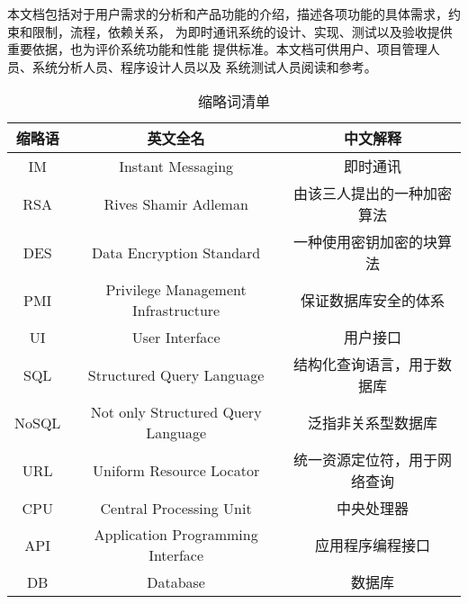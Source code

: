     本文档包括对于用户需求的分析和产品功能的介绍，描述各项功能的具体需求，约束和限制，流程，依赖关系，
    为即时通讯系统的设计、实现、测试以及验收提供重要依据，也为评价系统功能和性能
    提供标准。本文档可供用户、项目管理人员、系统分析人员、程序设计人员以及
    系统测试人员阅读和参考。
\begin{table}[htbp]
    \centering
    \caption{缩略词清单} \label{tab:simpletable}
    \begin{tabular}{|c|c|c|}
        \hline
        缩略语 & 英文全名 & 中文解释 \\
        \hline
        IM & Instant Messaging & 即时通讯 \\
        \hline
        RSA & Rives Shamir Adleman & 由该三人提出的一种加密算法 \\
        \hline
        DES & Data Encryption Standard & 一种使用密钥加密的块算法 \\
        \hline
        PMI & Privilege Management Infrastructure & 保证数据库安全的体系 \\
        \hline
        UI & User Interface & 用户接口 \\
        \hline
        SQL & Structured Query Language & 结构化查询语言，用于数据库 \\
        \hline
        NoSQL & Not only Structured Query Language & 泛指非关系型数据库 \\
        \hline
        URL & Uniform Resource Locator & 统一资源定位符，用于网络查询 \\
        \hline
        CPU & Central Processing Unit & 中央处理器 \\
        \hline
        API & Application Programming Interface & 应用程序编程接口 \\
        \hline
        DB & Database & 数据库 \\
        \hline
    \end{tabular}
\end{table}
